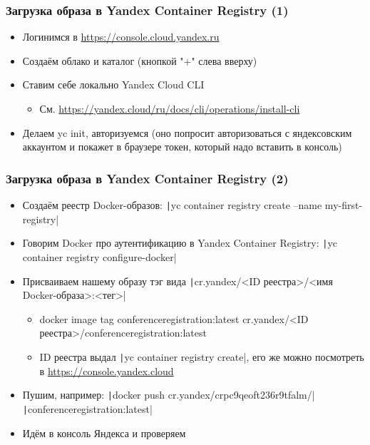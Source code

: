 \documentclass{../../slides-style}
\begin{document}
    \begin{frame}
        \frametitle{Загрузка образа в Yandex Container Registry (1)}
        \begin{itemize}
            \item Логинимся в \url{https://console.cloud.yandex.ru}
            \item Создаём облако и каталог (кнопкой "+" слева  вверху)
            \item Ставим себе локально Yandex Cloud CLI
            \begin{itemize}
                \item См. \url{https://yandex.cloud/ru/docs/cli/operations/install-cli}
            \end{itemize}
            \item Делаем yc init, авторизуемся (оно попросит авторизоваться с яндексовским аккаунтом и покажет в браузере токен, который надо вставить в консоль)
        \end{itemize}
    \end{frame}

    \begin{frame}
        \frametitle{Загрузка образа в Yandex Container Registry (2)}
        \begin{itemize}
            \item Создаём реестр Docker-образов: \texttt|yc container registry create --name my-first-registry|
            \item Говорим Docker про аутентификацию в Yandex Container Registry: \texttt|yc container registry configure-docker|
            \item Присваиваем нашему образу тэг вида \texttt|cr.yandex/<ID реестра>/<имя Docker-образа>:<тег>|
            \begin{itemize}
                \item docker image tag conferenceregistration:latest cr.yandex/<ID реестра>/conferenceregistration:latest
                \item ID реестра выдал \texttt|yc container registry create|, его же можно посмотреть в \url{https://console.yandex.cloud}
            \end{itemize}
            \item Пушим, например: \texttt|docker push cr.yandex/crpc9qeoft236r9tfalm/| \\ \texttt|conferenceregistration:latest|
            \item Идём в консоль Яндекса и проверяем
        \end{itemize}
    \end{frame}
\end{document}
